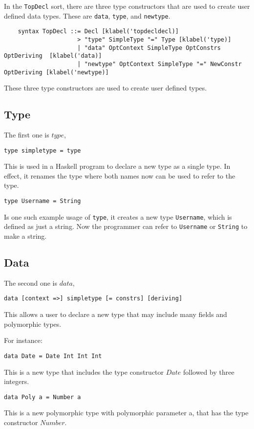 In the \texttt{TopDecl} sort, there are three type constructors that are used to create user defined data types. These are \texttt{data}, \texttt{type}, and \texttt{newtype}.

\begin{lstlisting}
    syntax TopDecl ::= Decl [klabel('topdecldecl)]
                     > "type" SimpleType "=" Type [klabel('type)]
                     | "data" OptContext SimpleType OptConstrs OptDeriving  [klabel('data)]
                     | "newtype" OptContext SimpleType "=" NewConstr OptDeriving [klabel('newtype)]
\end{lstlisting}

These three type constructors are used to create user defined types.

\subsection{Type}
The first one is $type$,
	\begin{lstlisting}
type simpletype = type 
	\end{lstlisting}
This is used in a Haskell program to declare a new type as a single type. In effect, it renames the type where both names now can be used to refer to the type.
	\begin{lstlisting}
type Username = String
	\end{lstlisting}
Is one such example usage of \texttt{type}, it creates a new type \texttt{Username}, which is defined as just a string. Now the programmer can refer to \texttt{Username} or \texttt{String} to make a string.

\subsection{Data}
The second one is $data$,
\begin{lstlisting}
data [context =>] simpletype [= constrs] [deriving]
\end{lstlisting}
This allows a user to declare a new type that may include many fields and polymorphic types.

For instance:
\begin{lstlisting}
data Date = Date Int Int Int
\end{lstlisting}
This is a new type that includes the type constructor $Date$ followed by three integers.
\begin{lstlisting}
data Poly a = Number a
\end{lstlisting}
This is a new polymorphic type with polymorphic parameter a, that has the type constructor $Number$.

